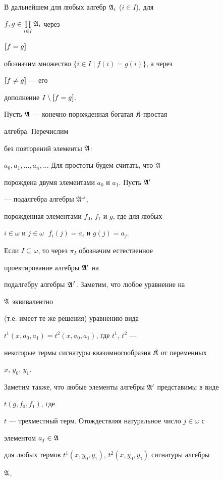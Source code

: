 \begin{pf}


В дальнейшем для любых алгебр $\frak A_i$ ($i\in I$), для


$f,g\in\prod\limits_{i\in I}\frak A_i$ через


$\boldsymbol [ f=g\boldsymbol ]$


обозначим множество $\{i\in I\mid f(i)=g(i)\}$, а через


$\boldsymbol [ f\ne g\boldsymbol ]$ --- его


дополнение $I\setminus\boldsymbol [ f=g\boldsymbol ]$.





Пусть $\frak A$ --- конечно-порожденная богатая $\frak K$-простая


алгебра. Перечислим


без повторений элементы $\frak A$:


$a_0,a_1,\dotsc,a_n,\dotsc$ Для простоты будем считать, что $\frak A$


порождена двумя элементами $a_0$ и $a_1$. Пусть $\frak A'$


--- подалгебра алгебры $\frak A^{\omega}$,


порожденная элементами $f_0$, $f_1$ и $g$, где для любых


$i\in\omega$ и $j\in\omega\;$ $f_i(j)=a_i$ и $g(j)=a_j$.


Если $I\subseteq\omega$, то через $\pi_I$ обозначим естественное


проектирование алгебры $\frak A'$ на


подалгебру алгебры $\frak A^I$. Заметим, что любое уравнение на


$\frak A$ эквивалентно


(т.е. имеет те же решения) уравнению вида


$t^1(x,a_0,a_1)=t^2(x,a_0,a_1)$, где $t^1$, $t^2$ ---


некоторые термы сигнатуры квазимногообразия $\frak K$ от переменных


$x$, $y_0$, $y_1$.


Заметим также, что любые элементы алгебры $\frak A'$ представимы в виде


$t(g,f_0,f_1)$, где


$t$ --- трехместный терм. Отождествляя натуральное число $j\in\omega$ с


элементом $a_j\in\frak A$


для любых термов $t^1(x,y_0,y_1)$, $t^2(x,y_0,y_1)$ сигнатуры алгебры


$\frak A$,



\end{pf}
